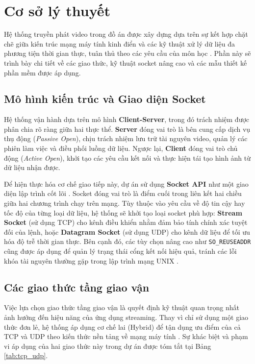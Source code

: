 \section{Cơ sở lý thuyết}

Hệ thống truyền phát video trong đồ án được xây dựng dựa trên sự kết hợp chặt chẽ giữa kiến trúc mạng máy tính kinh điển và các kỹ thuật xử lý dữ liệu đa phương tiện thời gian thực, tuân thủ theo các yêu cầu của môn học \cite{lehaminh2024socket}. Phần này sẽ trình bày chi tiết về các giao thức, kỹ thuật socket nâng cao và các mẫu thiết kế phần mềm được áp dụng.

\subsection{Mô hình kiến trúc và Giao diện Socket}

Hệ thống vận hành dựa trên mô hình \textbf{Client-Server}, trong đó trách nhiệm được phân chia rõ ràng giữa hai thực thể. \textbf{Server} đóng vai trò là bên cung cấp dịch vụ thụ động (\textit{Passive Open}), chịu trách nhiệm lưu trữ tài nguyên video, quản lý các phiên làm việc và điều phối luồng dữ liệu. Ngược lại, \textbf{Client} đóng vai trò chủ động (\textit{Active Open}), khởi tạo các yêu cầu kết nối và thực hiện tái tạo hình ảnh từ dữ liệu nhận được.

Để hiện thực hóa cơ chế giao tiếp này, dự án sử dụng \textbf{Socket API} như một giao diện lập trình cốt lõi \cite{stevens2004unix}. Socket đóng vai trò là điểm cuối trong liên kết hai chiều giữa hai chương trình chạy trên mạng. Tùy thuộc vào yêu cầu về độ tin cậy hay tốc độ của từng loại dữ liệu, hệ thống sẽ khởi tạo loại socket phù hợp: \textbf{Stream Socket} (sử dụng TCP) cho kênh điều khiển nhằm đảm bảo tính chính xác tuyệt đối của lệnh, hoặc \textbf{Datagram Socket} (sử dụng UDP) cho kênh dữ liệu để tối ưu hóa độ trễ thời gian thực. Bên cạnh đó, các tùy chọn nâng cao như \texttt{SO\_REUSEADDR} cũng được áp dụng để quản lý trạng thái cổng kết nối hiệu quả, tránh các lỗi khóa tài nguyên thường gặp trong lập trình mạng UNIX \cite{stevens2004unix}.

\subsection{Các giao thức tầng giao vận}

Việc lựa chọn giao thức tầng giao vận là quyết định kỹ thuật quan trọng nhất ảnh hưởng đến hiệu năng của ứng dụng streaming. Thay vì chỉ sử dụng một giao thức đơn lẻ, hệ thống áp dụng cơ chế lai (Hybrid) để tận dụng ưu điểm của cả TCP và UDP theo kiến thức nền tảng về mạng máy tính \cite{kurose2021computer}. Sự khác biệt và phạm vi áp dụng của hai giao thức này trong dự án được tóm tắt tại Bảng \ref{tab:tcp_udp}.


